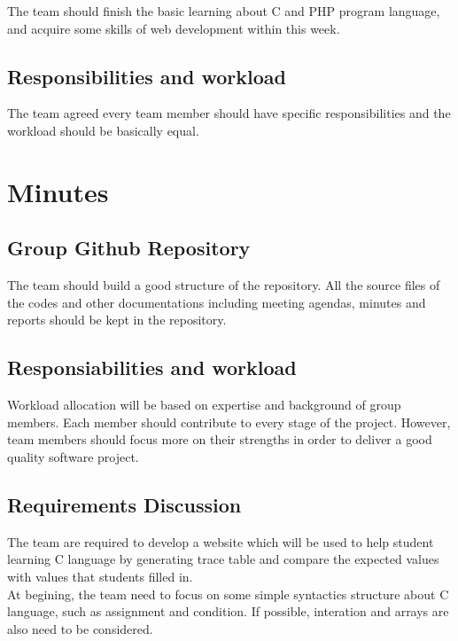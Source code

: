 \documentclass[11pt, a4paper]{article}
\begin{document}
The team should finish the basic learning about C and PHP program language, and acquire some skills of web development within this week. \\

\subsection{Responsibilities and workload}

The team agreed every team member should have specific responsibilities and the workload should be basically equal.\\


\section{Minutes}

\subsection{Group Github Repository}

The team should build a good structure of the repository. All the source files of the codes and other documentations including meeting agendas, minutes and reports should be kept in the repository.\\

\subsection{Responsiabilities and workload}

Workload allocation will be based on expertise and background of group members. Each member should contribute to every stage of the project. However, team members should focus more on their strengths in order to deliver a good quality software project.\\


\subsection{Requirements Discussion}

The team are required to develop a website which will be used to help student learning C language by generating trace table and compare the expected values with values that students filled in.\\


At begining, the team need to focus on some simple syntactics structure about C language, such as assignment and condition. If possible, interation and arrays are also need to be considered.\\
\end{document}
